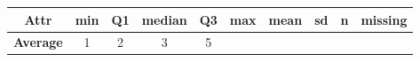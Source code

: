 \documentclass[]{book}
\begin{document}
\begin{longtable}[]{@{}cccccccccc@{}}
\toprule
\begin{minipage}[b]{0.15\columnwidth}\centering\strut
Attr\strut
\end{minipage} & \begin{minipage}[b]{0.05\columnwidth}\centering\strut
min\strut
\end{minipage} & \begin{minipage}[b]{0.04\columnwidth}\centering\strut
Q1\strut
\end{minipage} & \begin{minipage}[b]{0.08\columnwidth}\centering\strut
median\strut
\end{minipage} & \begin{minipage}[b]{0.04\columnwidth}\centering\strut
Q3\strut
\end{minipage} & \begin{minipage}[b]{0.05\columnwidth}\centering\strut
max\strut
\end{minipage} & \begin{minipage}[b]{0.08\columnwidth}\centering\strut
mean\strut
\end{minipage} & \begin{minipage}[b]{0.08\columnwidth}\centering\strut
sd\strut
\end{minipage} & \begin{minipage}[b]{0.06\columnwidth}\centering\strut
n\strut
\end{minipage} & \begin{minipage}[b]{0.08\columnwidth}\centering\strut
missing\strut
\end{minipage}\tabularnewline
\midrule
\endhead
\begin{minipage}[t]{0.15\columnwidth}\centering\strut
\textbf{Average}\strut
\end{minipage} & \begin{minipage}[t]{0.05\columnwidth}\centering\strut
1\strut
\end{minipage} & \begin{minipage}[t]{0.04\columnwidth}\centering\strut
2\strut
\end{minipage} & \begin{minipage}[t]{0.08\columnwidth}\centering\strut
3\strut
\end{minipage} & \begin{minipage}[t]{0.04\columnwidth}\centering\strut
5\strut
\end{minipage} & \begin{minipage}[t]{0.05\columnwidth}\centering\strut

\end{minipage}
\end{longtable}
\end{document}
